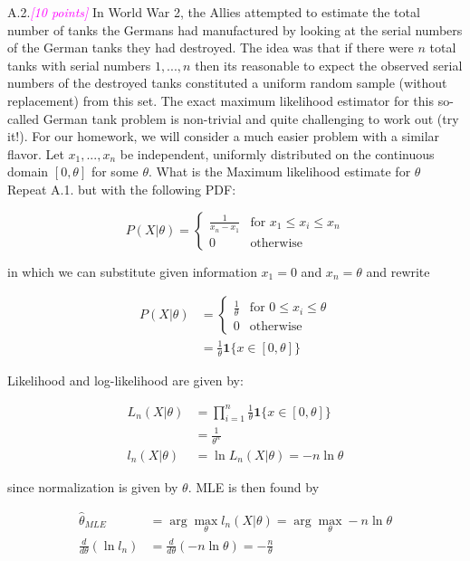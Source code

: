 \documentclass{article}
\newcommand{\argmax}{\arg\!\max}
\newcommand{\1}{\mathbf{1}}
\newcommand{\points}[1]{\small\textcolor{magenta}{\emph{[#1 points]}} \normalsize}
\begin{document}
\newpage
A.2.\points{10} In  World  War  2,  the  Allies  attempted  to  estimate  the  total  number  of  tanks  the  Germans had manufactured by looking at the serial numbers of the German tanks they had destroyed.  The idea was that if there were $n$ total tanks with serial numbers ${1,...,n}$ then its reasonable to expect the observed serial numbers of the destroyed tanks constituted a uniform random sample (without replacement) from this set. The exact maximum likelihood estimator for this so-called German tank problem is non-trivial and quite challenging to work out (try it!). For our homework, we will consider a much easier problem with a similar flavor. Let $x_1,...,x_n$ be independent, uniformly distributed on the continuous domain $[0,\theta]$ for some $\theta$.  What is the Maximum likelihood estimate for $\theta$ \\
Repeat A.1. but with the following PDF: 

$$ P(X|\theta) = \begin{cases} 
\frac{1}{x_n-x_1} &\mbox{for } x_1 \leq x_i \leq x_n \\ 
0 &\mbox{otherwise}
\end{cases}$$

in which we can substitute given information $x_1=0$ and $x_n=\theta$ and rewrite

\begin{align*}
P(X|\theta) &= \begin{cases} 
        \frac{1}{\theta} &\mbox{for } 0 \leq x_i \leq \theta \\ 
        0 &\mbox{otherwise}
    \end{cases}\\
& = \frac{1}{\theta} \1 \{ x \in [0,\theta] \}
\end{align*}

Likelihood and log-likelihood are given by:

\begin{align*}
L_n(X|\theta) &= \prod_{i=1}^n\frac{1}{\theta} \1 \{ x \in [0,\theta] \} \\
&=\frac{1}{\theta^n} \\
l_n(X|\theta) &= \ln L_n(X|\theta) = -n\ln\theta
\end{align*}

since normalization is given by $\theta$. MLE is then found by

\begin{align*}
\widehat\theta_{MLE} &= \argmax_\theta l_n(X|\theta) = \argmax_\theta -n\ln\theta \\
 \frac{d}{d\theta}(\ln l_n) &= \frac{d}{d\theta}(-n\ln\theta) = -\frac{n}{\theta} 
\end{align*}
\end{document}
